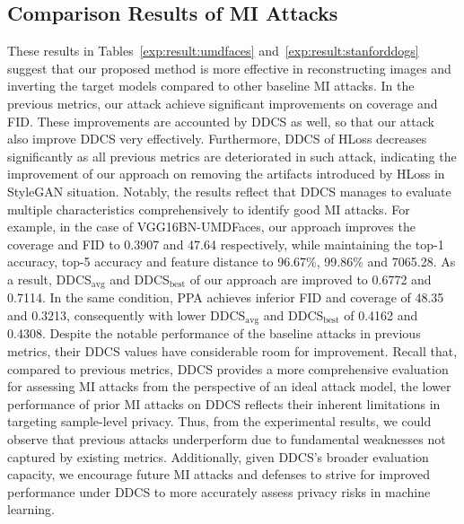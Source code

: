 \subsection{Comparison Results of MI Attacks}
These results in Tables~\ref{exp:result:umdfaces} and~\ref{exp:result:stanforddogs} suggest that our proposed method is more effective in reconstructing images and inverting the target models compared to other baseline MI attacks.
In the previous metrics, our attack achieve significant improvements on coverage and FID. These improvements are accounted by DDCS as well, so that our attack also improve DDCS very effectively.
Furthermore, DDCS of HLoss decreases significantly as all previous metrics are deteriorated in such attack, indicating the improvement of our approach on removing the artifacts introduced by HLoss in StyleGAN situation.
Notably, the results reflect that DDCS manages to evaluate multiple characteristics comprehensively to identify good MI attacks.
For example, in the case of VGG16BN-UMDFaces, our approach improves the coverage and FID to 0.3907 and 47.64 respectively, while maintaining the top-1 accuracy, top-5 accuracy and feature distance to 96.67\%, 99.86\% and 7065.28. As a result, DDCS$_{\text{avg}}$ and DDCS$_{\text{best}}$ of our approach are improved to 0.6772 and 0.7114.
In the same condition, PPA achieves inferior FID and coverage of 48.35 and 0.3213, consequently with lower DDCS$_{\text{avg}}$ and DDCS$_{\text{best}}$ of 0.4162 and 0.4308.
Despite the notable performance of the baseline attacks in previous metrics, their DDCS values have considerable room for improvement.
Recall that, compared to previous metrics, DDCS provides a more comprehensive evaluation for assessing MI attacks from the perspective of an ideal attack model, the lower performance of prior MI attacks on DDCS reflects their inherent limitations in targeting sample-level privacy. Thus, from the experimental results, we could observe that previous attacks underperform due to fundamental weaknesses not captured by existing metrics. Additionally, given DDCS's broader evaluation capacity, we encourage future MI attacks and defenses to strive for improved performance under DDCS to more accurately assess privacy risks in machine learning.

